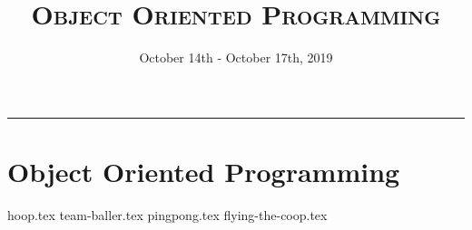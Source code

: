 \documentclass{exam}
\title{\textsc{Object Oriented Programming}}
\date{October 14th - October 17th, 2019}
\begin{document}
\maketitle
\rule{\textwidth}{0.15em}
\fontsize{12}{15}\selectfont

\section{Object Oriented Programming}
\begin{questions}
{hoop.tex}
{team-baller.tex}
{pingpong.tex}
{flying-the-coop.tex}
\end{questions}
\end{document}
